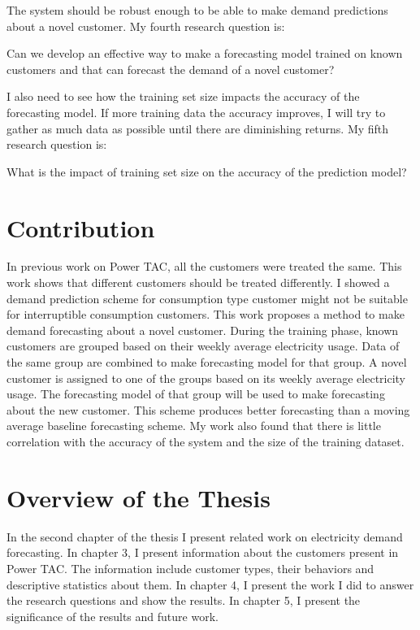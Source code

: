The system should be robust enough to be able to make demand predictions about a novel customer. My fourth research question is:
\begin{displayquote}
Can we develop an effective way to make a forecasting model trained on known customers and that can forecast the demand of a novel customer?
\end{displayquote}

I also need to see how the training set size impacts the accuracy of the forecasting model. If more training data the accuracy improves, I will try to gather as much data as possible until there are diminishing returns. My fifth research question is:
\begin{displayquote}
What is the impact of training set size on the accuracy of the prediction model?
\end{displayquote}
 
\section{Contribution}
In previous work on Power TAC, all the customers were treated the same. This work shows that different customers should be treated differently. I showed a demand prediction scheme for consumption type customer might not be suitable for interruptible consumption customers. This work proposes a method to make demand forecasting about a novel customer. During the training phase, known customers are grouped based on their weekly average electricity usage. Data of the same group are combined to make forecasting model for that group. A novel customer is assigned to one of the groups based on its weekly average electricity usage. The forecasting model of that group will be used to make forecasting about the new customer. This scheme produces better forecasting than a moving average baseline forecasting scheme. My work also found that there is little correlation with the accuracy of the system and the size of the training dataset. 

\section{Overview of the Thesis}
In the second chapter of the thesis I present related work on electricity demand forecasting. In chapter 3, I present information about the customers present in Power TAC. The information include customer types, their behaviors and descriptive statistics about them. In chapter 4, I present the work I did to answer the research questions and show the results. In chapter 5, I present the significance of the results and future work.


